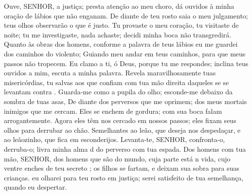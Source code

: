{\PP 
  Ouve, SENHOR, a
{} justiça; presta atenção ao meu choro, dá ouvidos à minha oração de lábios que não enganam.
  De diante de teu rosto saia o meu julgamento; teus olhos observarão o que é justo.
  Tu
{} provaste o meu coração, tu
{} visitaste de noite; tu me investigaste,
{} nada achaste; decidi
{} minha boca não transgredirá.
  Quanto às obras dos homens, conforme a palavra de teus lábios eu me guardei dos caminhos do violento;
  Guiando meu andar em teus caminhos, para que meus passos não tropecem.
  Eu clamo a ti, ó Deus, porque tu me respondes; inclina teus ouvidos a mim, escuta a minha palavra.
  Revela maravilhosamente tuas misericórdias, tu salvas aos que confiam
{} com tua mão direita daqueles se se levantam contra
{} .
  Guarda-me como a pupila do olho; esconde-me debaixo da sombra de tuas asas,
  De diante dos perversos que me oprimem; dos meus mortais inimigos que me cercam.
  Eles se enchem de gordura; com sua boca falam arrogantemente.
  Agora eles têm nos cercado em nossos passos; eles fixam seus olhos para
{} derrubar ao chão.
  Semelhantes ao leão, que deseja nos despedaçar, e ao leãozinho, que fica em esconderijos.
  Levanta-te, SENHOR, confronta-o, derruba-o; livra minha alma d
{} do perverso com tua espada.
  Dos homens com tua mão, SENHOR, dos homens que são do mundo, cuja parte está n
{} vida, cujo ventre enches de teu secreto
{} ; os filhos se fartam, e deixam sua sobra para suas crianças.
   eu olharei para teu rosto em justiça; serei satisfeito de tua semelhança, quando eu despertar.
\par }


